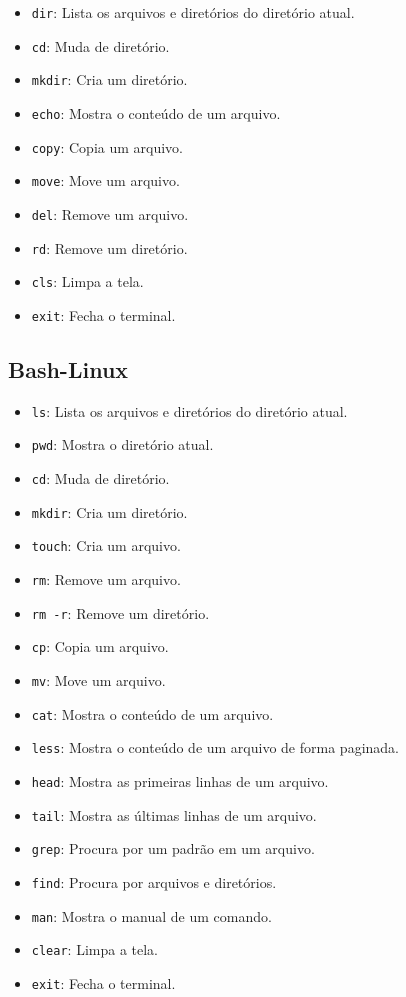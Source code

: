 \documentclass[a4paper, 12pt]{article}
\begin{document}
\begin{itemize}
    \item \texttt{dir}: Lista os arquivos e diretórios do diretório atual.
    \item \texttt{cd}: Muda de diretório.
    \item \texttt{mkdir}: Cria um diretório.
    \item \texttt{echo}: Mostra o conteúdo de um arquivo.
    \item \texttt{copy}: Copia um arquivo.
    \item \texttt{move}: Move um arquivo.
    \item \texttt{del}: Remove um arquivo.
    \item \texttt{rd}: Remove um diretório.
    \item \texttt{cls}: Limpa a tela.
    \item \texttt{exit}: Fecha o terminal.
\end{itemize}

\subsection{Bash-Linux}\label{bash-linux}

\begin{itemize}

    \item \texttt{ls}: Lista os arquivos e diretórios do diretório atual.
    \item \texttt{pwd}: Mostra o diretório atual.
    \item \texttt{cd}: Muda de diretório.
    \item \texttt{mkdir}: Cria um diretório.
    \item \texttt{touch}: Cria um arquivo.
    \item \texttt{rm}: Remove um arquivo.
    \item \texttt{rm -r}: Remove um diretório.
    \item \texttt{cp}: Copia um arquivo.
    \item \texttt{mv}: Move um arquivo.
    \item \texttt{cat}: Mostra o conteúdo de um arquivo.
    \item \texttt{less}: Mostra o conteúdo de um arquivo de forma paginada.

    \item \texttt{head}: Mostra as primeiras linhas de um arquivo.
    \item \texttt{tail}: Mostra as últimas linhas de um arquivo.

    \item \texttt{grep}: Procura por um padrão em um arquivo.
    \item \texttt{find}: Procura por arquivos e diretórios.
    \item \texttt{man}: Mostra o manual de um comando.
    \item \texttt{clear}: Limpa a tela.
    \item \texttt{exit}: Fecha o terminal.
\end{itemize}
\end{document}
